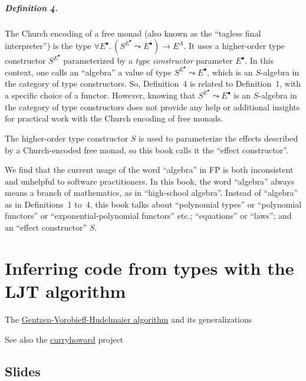 \paragraph{Definition 4.}

The Church encoding of a free monad (also known as the \textsf{``}tagless
final interpreter\textsf{''}) is the type $\forall E^{\bullet}.\,(S^{E^{\bullet}}\leadsto E^{\bullet})\rightarrow E^{A}$.
It uses a higher-order type constructor $S^{E^{\bullet}}$ parameterized
by a \emph{type constructor} parameter $E^{\bullet}$. In this context,
one calls an \textsf{``}algebra\textsf{''} a value of type $S^{E^{\bullet}}\leadsto E^{\bullet}$,
which is an $S$-algebra in the category of type constructors. So,
Definition~4 is related to Definition~1, with a specific choice
of a functor. However, knowing that $S^{E^{\bullet}}\leadsto E^{\bullet}$
is an $S$-algebra in the category of type constructors does not provide
any help or additional insights for practical work with the Church
encoding of free monads.

The higher-order type constructor $S$ is used to parameterize the
effects described by a Church-encoded free monad, so this book calls
it the \textsf{``}effect constructor\textsf{''}.

We find that the current usage of the word \textsf{``}algebra\textsf{''} in FP is
both inconsistent and unhelpful to software practitioners. In this
book, the word \textsf{``}algebra\textsf{''} always means a branch of mathematics,
as in \textsf{``}high-school algebra\textsf{''}. Instead of \textsf{``}algebra\textsf{''} as in Definitions~1
to~4, this book talks about \textsf{``}polynomial types\textsf{''} or \textsf{``}polynomial
functors\textsf{''} or \textsf{``}exponential-polynomial functors\textsf{''} etc.; \textsf{``}equations\textsf{''}
or \textsf{``}laws\textsf{''}; and an \textsf{``}effect constructor\textsf{''} $S$.

\chapter{Inferring code from types with the LJT algorithm\label{app:CH-correspondence-LJT-algorithm}}

The \href{http://apt13.unibe.ch/slides/Dyckhoff.pdf}{Gentzen-Vorobieff-Hudelmaier algorithm}
and its generalizations

See also the \href{https://github.com/Chymyst/curryhoward}{curryhoward}
project

\section{Slides}

